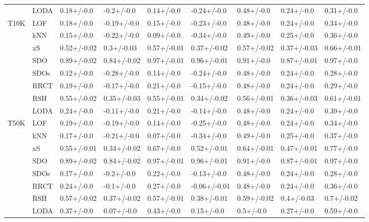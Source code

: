 \begin{table}
\begin{tabular}{lllllllll}
      & LODA &   0.18+/-0.0 &    -0.2+/-0.0 &   0.14+/-0.0 &   -0.24+/-0.0 &   0.48+/-0.0 &   0.24+/-0.0 &   0.31+/-0.0 \\
T10K & LOF &   0.18+/-0.0 &   -0.19+/-0.0 &   0.15+/-0.0 &   -0.23+/-0.0 &   0.48+/-0.0 &   0.24+/-0.0 &   0.34+/-0.0 \\
      & kNN &   0.15+/-0.0 &   -0.22+/-0.0 &   0.09+/-0.0 &   -0.34+/-0.0 &   0.49+/-0.0 &   0.25+/-0.0 &   0.36+/-0.0 \\
      & xS &  0.52+/-0.02 &    0.3+/-0.03 &  0.57+/-0.01 &   0.37+/-0.02 &  0.57+/-0.02 &  0.37+/-0.03 &  0.66+/-0.01 \\
      & SDO &  0.89+/-0.02 &   0.84+/-0.02 &  0.97+/-0.01 &   0.96+/-0.01 &   0.91+/-0.0 &  0.87+/-0.01 &   0.97+/-0.0 \\
      & SDOs &   0.12+/-0.0 &   -0.28+/-0.0 &   0.14+/-0.0 &   -0.24+/-0.0 &   0.48+/-0.0 &   0.24+/-0.0 &   0.28+/-0.0 \\
      & RRCT &   0.19+/-0.0 &   -0.17+/-0.0 &   0.21+/-0.0 &   -0.15+/-0.0 &   0.48+/-0.0 &   0.24+/-0.0 &   0.29+/-0.0 \\
      & RSH &  0.55+/-0.02 &   0.35+/-0.03 &  0.55+/-0.01 &   0.34+/-0.02 &  0.56+/-0.01 &  0.36+/-0.03 &  0.61+/-0.01 \\
      & LODA &   0.24+/-0.0 &   -0.11+/-0.0 &   0.21+/-0.0 &   -0.14+/-0.0 &   0.48+/-0.0 &   0.24+/-0.0 &   0.39+/-0.0 \\
T50K & LOF &   0.19+/-0.0 &   -0.19+/-0.0 &   0.14+/-0.0 &   -0.25+/-0.0 &   0.48+/-0.0 &   0.24+/-0.0 &   0.34+/-0.0 \\
      & kNN &   0.17+/-0.0 &   -0.21+/-0.0 &   0.07+/-0.0 &   -0.34+/-0.0 &   0.49+/-0.0 &   0.25+/-0.0 &   0.37+/-0.0 \\
      & xS &  0.55+/-0.01 &   0.34+/-0.02 &   0.67+/-0.0 &   0.52+/-0.01 &  0.64+/-0.01 &  0.47+/-0.01 &   0.77+/-0.0 \\
      & SDO &  0.89+/-0.02 &   0.84+/-0.02 &  0.97+/-0.01 &   0.96+/-0.01 &   0.91+/-0.0 &  0.87+/-0.01 &   0.97+/-0.0 \\
      & SDOs &   0.17+/-0.0 &    -0.2+/-0.0 &   0.22+/-0.0 &   -0.13+/-0.0 &   0.48+/-0.0 &   0.24+/-0.0 &   0.28+/-0.0 \\
      & RRCT &   0.24+/-0.0 &    -0.1+/-0.0 &   0.27+/-0.0 &  -0.06+/-0.01 &   0.48+/-0.0 &   0.24+/-0.0 &   0.36+/-0.0 \\
      & RSH &  0.57+/-0.02 &   0.37+/-0.02 &  0.57+/-0.01 &   0.38+/-0.01 &  0.59+/-0.02 &   0.4+/-0.03 &   0.7+/-0.02 \\
      & LODA &   0.37+/-0.0 &    0.07+/-0.0 &   0.43+/-0.0 &    0.15+/-0.0 &    0.5+/-0.0 &   0.27+/-0.0 &   0.59+/-0.0 \\

\end{tabular}
\end{table}
